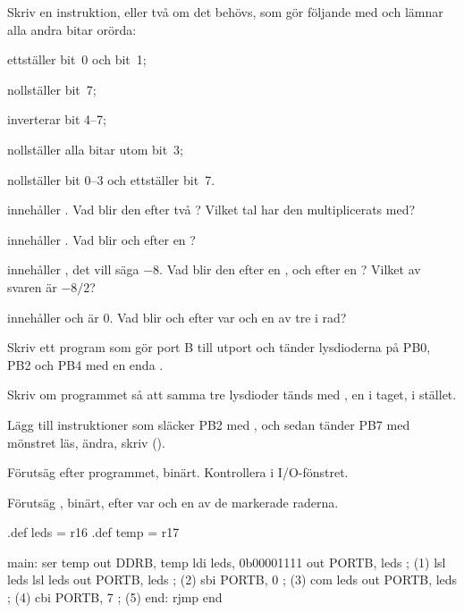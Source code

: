 \label{c8:ex:7}
Skriv en instruktion, eller två om det behövs, som gör följande med  och lämnar alla
andra bitar orörda:
\begin{parts}
  \item ettställer bit~0 och bit~1;
  \item nollställer bit~7;
  \item inverterar bit 4--7;
  \item nollställer alla bitar utom bit~3;
  \item nollställer bit 0--3 och ettställer bit~7.
\end{parts}

\label{c8:ex:8}
\begin{parts}
  \item {} innehåller . Vad blir den efter två ? Vilket tal har
    den multiplicerats med?
  \item {} innehåller . Vad blir  och  efter en
    ?
  \item {} innehåller , det vill säga $-8$. Vad blir den efter en ,
    och efter en ? Vilket av svaren är $-8 / 2$?
  \item {} innehåller  och  är 0. Vad blir  och
     efter var och en av tre  i rad?
\end{parts}

\label{c8:ex:9}
\begin{parts}
  \item Skriv ett program som gör port B till utport och tänder lysdioderna på PB0, PB2 och PB4
    med en enda .
  \item Skriv om programmet så att samma tre lysdioder tänds med , en i taget, i
    stället.
  \item Lägg till instruktioner som släcker PB2 med , och sedan tänder PB7 med mönstret
    läs, ändra, skriv ().
  \item Förutsäg  efter programmet, binärt. Kontrollera i I/O-fönstret.
\end{parts}

\label{c8:ex:10}
Förutsäg , binärt, efter var och en av de markerade raderna.

\begin{asmcode}
.def leds = r16
.def temp = r17

main:
    ser temp
    out DDRB, temp
    ldi leds, 0b00001111
    out PORTB, leds                 ; (1)
    lsl leds
    lsl leds
    out PORTB, leds                 ; (2)
    sbi PORTB, 0                    ; (3)
    com leds
    out PORTB, leds                 ; (4)
    cbi PORTB, 7                    ; (5)
end:
    rjmp end
\end{asmcode}

